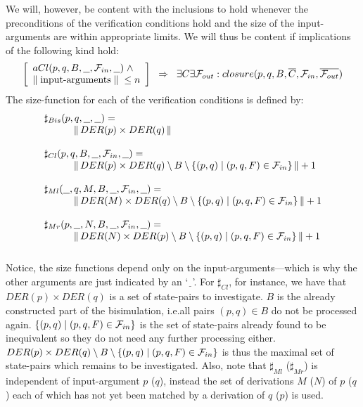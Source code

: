 We will, however, be content with the inclusions to hold whenever the preconditions of the verification conditions hold and the size of the input-arguments are within appropriate limits. We will thus be content if implications of the following kind hold:
\[
\left[
\begin{array}{l}
aCl(p,q,B,\underline{\ \ },{\cal F}_{in},\underline{\ \ })\;\wedge\\
\|\;\mbox{input-arguments}\;\|\;\leq n
\end{array}
\right]\;\;\Rightarrow\;\;
\exists C\exists{\cal F}_{out}: closure(p,q,B,\overline{C},{\cal F}_{in},\overline{{\cal F}_{out}})
\]
The size-function for each of the verification conditions is defined by:
\[
\begin{array}{llll}
\multicolumn{4}{l}{\sharp_{Bis}(p,q,\underline{\ \ },\underline{\ \ }) =}\\
&&& \|\, DER(p)\times DER(q) \,\| \\
\\
\multicolumn{4}{l}{\sharp_{Cl}(p,q,B,\underline{\ \ },{\cal F}_{in},\underline{\ \ }) =}\\
&&& \|\, DER(p)\times DER(q) \setminus B\setminus\{(p,q)\mid(p,q,F)\in{\cal F}_{in}\}\,\| +1\\
\\
\multicolumn{4}{l}{\sharp_{Ml}(\underline{\ \ },q,M,B,\underline{\ \ },{\cal F}_{in},\underline{\ \ }) =}\\
&&& \|\, DER(M)\times DER(q) \setminus B\setminus\{(p,q)\mid(p,q,F)\in{\cal F}_{in}\}\,\| +1\\
\\
\multicolumn{4}{l}{\sharp_{Mr}(p,\underline{\ \ },N,B,\underline{\ \ },{\cal F}_{in},\underline{\ \ }) =}\\
&&& \|\, DER(N)\times DER(p) \setminus B\setminus\{(p,q)\mid(p,q,F)\in{\cal F}_{in}\}\,\| +1\\
\\
\end{array}
\]
Notice, the size functions depend only on the input-arguments---which is why the other arguments are just indicated by an `$\underline{\ \ }$'. For $\sharp_{Cl}$, for instance, we have that $DER(p)\times DER(q)$ is a set of state-pairs to investigate. $B$ is the already constructed part of the bisimulation, i.e.\@ all pairs $(p,q)\in B$ do not be processed again. $\{(p,q)\mid (p,q,F)\in {\cal F}_{in}\}$ is the set of state-pairs already found to be inequivalent so they do not need any further processing either. $DER(p)\times DER(q) \setminus B\setminus\{(p,q)\mid(p,q,F)\in{\cal F}_{in}\}$ is thus the maximal set of state-pairs which remains to be investigated. Also, note that $\sharp_{Ml}$ ($\sharp_{Mr}$) is independent of input-argument $p$ ($q$), instead the set of derivations $M$ ($N$) of $p$ ($q$) each of which has not yet been matched by a derivation of $q$ ($p$) is used.

